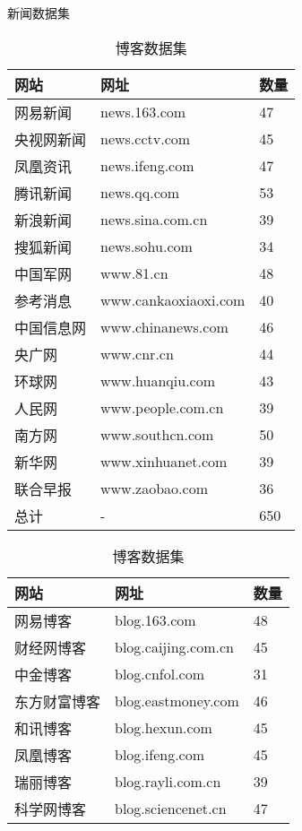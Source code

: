 \begin{table}[htbp]
\centering
\begin{minipage}{0.45\textwidth}
\caption{新闻数据集}
\label{tbl:news-dataset}
\vspace{0.5em}\centering\wuhao
\begin{tabular}{lll}
\toprule[1.5pt]
网站 & 网址 & 数量 \\
\midrule[1pt]
网易新闻 & news.163.com & 47 \\
央视网新闻 & news.cctv.com & 45 \\
凤凰资讯 & news.ifeng.com & 47 \\
腾讯新闻 & news.qq.com & 53 \\
新浪新闻 & news.sina.com.cn & 39 \\
搜狐新闻 & news.sohu.com & 34 \\
中国军网 & www.81.cn & 48 \\
参考消息 & www.cankaoxiaoxi.com & 40 \\
中国信息网 & www.chinanews.com & 46 \\
央广网 & www.cnr.cn & 44 \\
环球网 & www.huanqiu.com & 43 \\
人民网 & www.people.com.cn & 39 \\
南方网 & www.southcn.com & 50 \\
新华网 & www.xinhuanet.com & 39 \\
联合早报 & www.zaobao.com & 36 \\
总计 & - & 650 \\
\bottomrule[1.5pt]
\end{tabular}
\end{minipage}
\hfill
\begin{minipage}{0.45\textwidth}
\caption{博客数据集}
\label{tbl:blog-dataset}
\vspace{0.5em}\centering\wuhao
\begin{tabular}{lll}
\toprule[1.5pt]
网站 & 网址 & 数量 \\
\midrule[1pt]
网易博客 & blog.163.com & 48 \\
财经网博客 & blog.caijing.com.cn & 45 \\
中金博客 & blog.cnfol.com & 31 \\
东方财富博客 & blog.eastmoney.com & 46 \\
和讯博客 & blog.hexun.com & 45 \\
凤凰博客 & blog.ifeng.com & 45 \\
瑞丽博客 & blog.rayli.com.cn & 39 \\
科学网博客 & blog.sciencenet.cn & 47 \\

\end{tabular}
\end{minipage}
\end{table}
